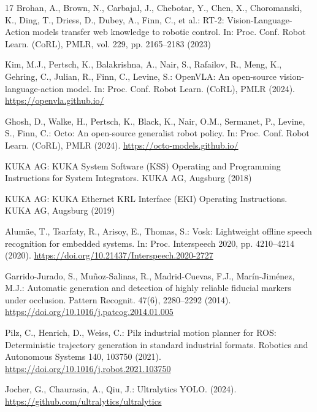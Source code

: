 \documentclass{svproc}
\begin{document}
\begin{thebibliography}{17}
Brohan, A., Brown, N., Carbajal, J., Chebotar, Y., Chen, X., Choromanski, K., Ding, T., Driess, D., Dubey, A., Finn, C., et al.: RT-2: Vision-Language-Action models transfer web knowledge to robotic control. In: Proc. Conf. Robot Learn. (CoRL), PMLR, vol. 229, pp. 2165--2183 (2023)

Kim, M.J., Pertsch, K., Balakrishna, A., Nair, S., Rafailov, R., Meng, K., Gehring, C., Julian, R., Finn, C., Levine, S.: OpenVLA: An open-source vision-language-action model. In: Proc. Conf. Robot Learn. (CoRL), PMLR (2024). \url{https://openvla.github.io/}

Ghosh, D., Walke, H., Pertsch, K., Black, K., Nair, O.M., Sermanet, P., Levine, S., Finn, C.: Octo: An open-source generalist robot policy. In: Proc. Conf. Robot Learn. (CoRL), PMLR (2024). \url{https://octo-models.github.io/}

KUKA AG: KUKA System Software (KSS) Operating and Programming Instructions for System Integrators. KUKA AG, Augsburg (2018)

KUKA AG: KUKA Ethernet KRL Interface (EKI) Operating Instructions. KUKA AG, Augsburg (2019)

Alumäe, T., Tsarfaty, R., Arisoy, E., Thomas, S.: Vosk: Lightweight offline speech recognition for embedded systems. In: Proc. Interspeech 2020, pp. 4210--4214 (2020). \url{https://doi.org/10.21437/Interspeech.2020-2727}

Garrido-Jurado, S., Muñoz-Salinas, R., Madrid-Cuevas, F.J., Marín-Jiménez, M.J.: Automatic generation and detection of highly reliable fiducial markers under occlusion. Pattern Recognit. 47(6), 2280--2292 (2014). \url{https://doi.org/10.1016/j.patcog.2014.01.005}

Pilz, C., Henrich, D., Weiss, C.: Pilz industrial motion planner for ROS: Deterministic trajectory generation in standard industrial formats. Robotics and Autonomous Systems 140, 103750 (2021). \url{https://doi.org/10.1016/j.robot.2021.103750}

Jocher, G., Chaurasia, A., Qiu, J.: Ultralytics YOLO. (2024). \url{https://github.com/ultralytics/ultralytics}

\end{thebibliography}

\newpage
\end{document}
